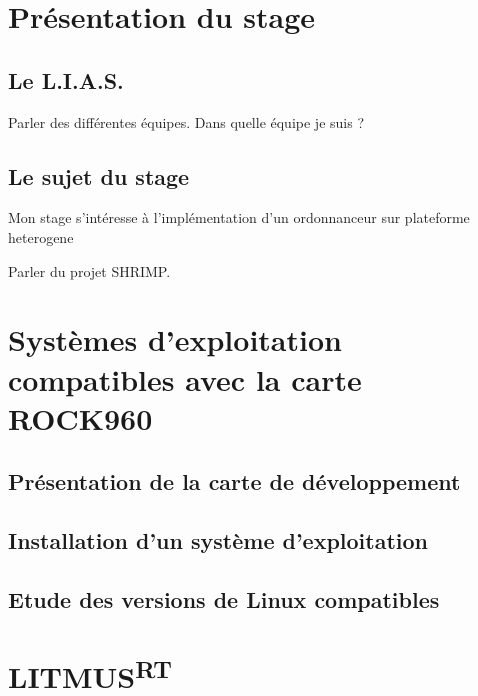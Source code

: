 \documentclass{article}
\newcommand{\litmus}{LITMUS\textsuperscript{RT}}
\begin{document}
    \section*{Présentation du stage}
    
    
    \subsection{Le L.I.A.S.}

    Parler des différentes équipes.
    Dans quelle équipe je suis ?
    \subsection{Le sujet du stage}
    
    Mon stage s'intéresse à l'implémentation d'un ordonnanceur sur \gls{plateforme heterogene}\cite{bertout2020workload}

    Parler du projet SHRIMP. %

    \newpage
    \section[OS compatibles avec la carte]{Systèmes d'exploitation compatibles avec la carte ROCK960}
    \subsection{Présentation de la carte de développement}
    

    \subsection{Installation d'un système d'exploitation}
    

    \subsection{Etude des versions de Linux compatibles}
    




    
    \newpage
    \section{\litmus}
    
\end{document}
